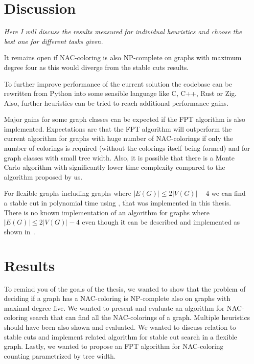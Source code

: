 
\chapter{Discussion}

\emph{Here I will discuss the results measured for individual heuristics
	and choose the best one for different tasks given.}

It remains open if NAC-coloring is also NP-complete on graphs with
maximum degree four as this would diverge from the stable cuts results.

To further improve performance of the current solution the codebase
can be rewritten from Python into some sensible language like C, C++, Rust or Zig.
Also, further heuristics can be tried to reach additional performance  gains.

Major gains for some graph classes
can be expected if the FPT algorithm is also implemented.
Expectations are that the FPT algorithm will outperform the current algorithm
for graphs with huge number of NAC-colorings if only the number of colorings
is required (without the colorings itself being formed) and
for graph classes with small tree width.
Also, it is possible that there is a Monte Carlo algorithm with significantly
lower time complexity compared to the algorithm proposed by us.

For flexible graphs including graphs where \( |E(G)| \le 2|V(G)| - 4 \)
we can find a stable cut in polynomial time using ,
that was implemented in this thesis.
There is no known implementation of an algorithm
for graphs where \( |E(G)| \le 2|V(G)| - 4 \)
even though it can be described and implemented
as shown in~\cite{stable_cuts_2v_3,stable_cuts_2v_3_revisit}.

\chapter{Results}

To remind you of the goals of the thesis,
we wanted to show that the problem of deciding if a graph has a NAC-coloring
is NP-complete also on graphs with maximal degree five.
We wanted to present and evaluate an algorithm for NAC-coloring search
that can find all the NAC-colorings of a graph.
Multiple heuristics should have been also shown and evaluated.
We wanted to discuss relation to stable cuts and implement related algorithm
for stable cut search in a flexible graph.
Lastly, we wanted to propose an FPT algorithm for NAC-coloring counting
parametrized by tree width.

